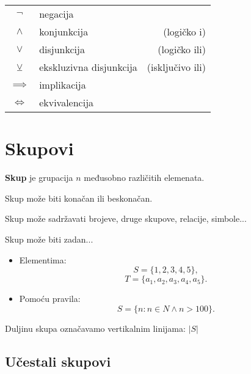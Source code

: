 \begin{tabular}{c|lr}
    $\neg$ & negacija &\\
    $\wedge$ & konjunkcija &(logičko i) \\
    $\vee$ & disjunkcija &(logičko ili) \\
    $\veebar$ & ekskluzivna disjunkcija &(isključivo ili) \\
    $\implies$ & implikacija &\\
    $\Leftrightarrow$ & ekvivalencija &\\
\end{tabular}

\section{Skupovi}

\begin{definition}[skup]
    \textbf{Skup} je grupacija $n$ međusobno različitih elemenata.
    
    Skup može biti konačan ili beskonačan.
    
    Skup može sadržavati brojeve, druge skupove, relacije, simbole...
\end{definition}

Skup može biti zadan...
\begin{itemize}
    \item Elementima:
        $$S = \{1, 2, 3, 4, 5\},$$
        $$T = \{a_1, a_2, a_3, a_4, a_5\}.$$
    \item Pomoću pravila:
        $$S = \{n: n \in N \land n > 100\}.$$
\end{itemize}

Duljinu skupa označavamo vertikalnim linijama: $|S|$

\subsection{Učestali skupovi}

